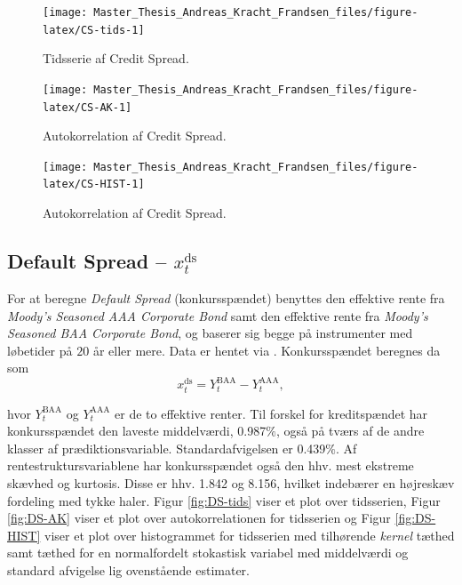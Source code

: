 \documentclass[
  a4paper,
  oneside]{memoir}
\begin{document}
\begin{figure}[htbp!]

{\centering \texttt{[image: Master\_Thesis\_Andreas\_Kracht\_Frandsen\_files/figure-latex/CS-tids-1]} 

}

\caption{Tidsserie af Credit Spread.}\label{fig:CS-tids}
\end{figure}

\begin{figure}[htbp!]

{\centering \texttt{[image: Master\_Thesis\_Andreas\_Kracht\_Frandsen\_files/figure-latex/CS-AK-1]} 

}

\caption{Autokorrelation af Credit Spread.}\label{fig:CS-AK}
\end{figure}

\begin{figure}[htbp!]

{\centering \texttt{[image: Master\_Thesis\_Andreas\_Kracht\_Frandsen\_files/figure-latex/CS-HIST-1]} 

}

\caption{Autokorrelation af Credit Spread.}\label{fig:CS-HIST}
\end{figure}

\hypertarget{default-spread-x_ttextds}{%
\subsection{\texorpdfstring{Default Spread -- \(x_t^{\text{ds}}\)}{Default Spread -- x\_t\^{}\{\textbackslash text\{ds\}\}}}\label{default-spread-x_ttextds}}

For at beregne \emph{Default Spread} (konkursspændet) benyttes den effektive rente fra \emph{Moody's Seasoned AAA Corporate Bond} samt den effektive rente fra \emph{Moody's Seasoned BAA Corporate Bond}, og baserer sig begge på instrumenter med løbetider på \(20\) år eller mere. Data er hentet via \citep{Goyal2007}. Konkursspændet beregnes da som
\[x_t^{\text{ds}}=Y_t^{\text{BAA}}-Y_t^{\text{AAA}},\]

hvor \(Y_t^{\text{BAA}}\) og \(Y_t^{\text{AAA}}\) er de to effektive renter. Til forskel for kreditspændet har konkursspændet den laveste middelværdi, 0.987\(\%\), også på tværs af de andre klasser af prædiktionsvariable. Standardafvigelsen er 0.439\(\%\). Af rentestruktursvariablene har konkursspændet også den hhv. mest ekstreme skævhed og kurtosis. Disse er hhv. 1.842 og 8.156, hvilket indebærer en højreskæv fordeling med tykke haler. Figur \ref{fig:DS-tids} viser et plot over tidsserien, Figur \ref{fig:DS-AK} viser et plot over autokorrelationen for tidsserien og Figur \ref{fig:DS-HIST} viser et plot over histogrammet for tidsserien med tilhørende \emph{kernel} tæthed samt tæthed for en normalfordelt stokastisk variabel med middelværdi og standard afvigelse lig ovenstående estimater.
\end{document}
